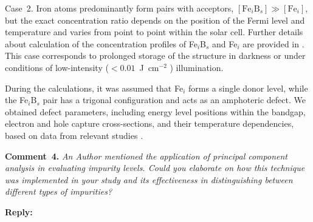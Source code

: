 \documentclass[a4paper,fleqn]{cas-sc}
\begin{document}
\begin{mdframed}
Case~2.
Iron atoms predominantly form pairs with acceptors, $\left[\mathrm{Fe}_i\mathrm{B}_s\right] \gg \left[\mathrm{Fe}_i\right]$,
\textcolor[rgb]{1.00,0.07,0.00}{but the exact concentration ratio depends on the position of the Fermi level and temperature} \cite{FeB:kinetic,MurphyJAP2011}
and varies from point to point within the solar cell.
Further details about calculation of the concentration profiles of Fe$_i$B$_s$ and Fe$_i$ are provided in \cite{Olikh2022PPV,Olikh2019SM}.
This case corresponds to prolonged storage of the structure in darkness or under conditions of low-intensity ($< 0.01$~J~cm$^{-2}$ \cite{Macdonald2004}) illumination.

During the calculations, it was assumed that Fe$_i$ forms a single donor level,
while the Fe$_i$B$_s$ pair has a trigonal configuration and acts as an amphoteric defect.
\textcolor[rgb]{1.00,0.07,0.00}{We obtained defect parameters, including energy level positions within the bandgap,
electron and hole capture cross-sections, and their temperature dependencies, based on data from relevant studies} \cite{ROUGIEUX2018,Istratov1999,Paudyal}.
\end{mdframed}







\vspace{1cm}
\noindent
\textcolor[rgb]{0.00,0.50,1.00}{\textbf{Comment~4.}}
\emph{An Author mentioned the application of principal component analysis in evaluating impurity levels.
Could you elaborate on how this technique was implemented in your study and its effectiveness in distinguishing between different types of impurities?}


\noindent
\textcolor[rgb]{0.51,0.00,0.00}{\textbf{Reply:}}
\end{document}
